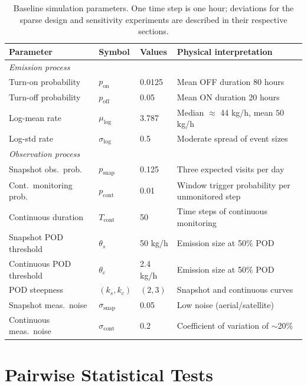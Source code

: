 \documentclass[11pt]{article}
\begin{document}
\begin{table}[h]
\centering
\caption{Baseline simulation parameters. One time step is one hour; deviations for the sparse design and sensitivity experiments are described in their respective sections.}
\label{tab:params}
\begin{tabular}{@{}p{}llp{}@{}}
\toprule
Parameter & Symbol & Values & Physical interpretation \\
\midrule
\multicolumn{4}{l}{\textit{Emission process}} \\
Turn-on probability & $p_{\text{on}}$ & 0.0125 & Mean OFF duration 80 hours \\
Turn-off probability & $p_{\text{off}}$ & 0.05 & Mean ON duration 20 hours \\
Log-mean rate & $\mu_{\log}$ & 3.787 & Median $\approx$ 44 kg/h, mean $50$ kg/h \\
Log-std rate & $\sigma_{\log}$ & 0.5 & Moderate spread of event sizes \\
\midrule
\multicolumn{4}{l}{\textit{Observation process}} \\
Snapshot obs.\ prob. & $p_{\text{snap}}$ & 0.125 & Three expected visits per day \\
Cont.\ monitoring prob. & $p_{\text{cont}}$ & 0.01 & Window trigger probability per unmonitored step \\
Continuous duration & $T_{\text{cont}}$ & 50 & Time steps of continuous monitoring \\
Snapshot POD threshold & $\theta_s$ & 50 kg/h & Emission size at 50\% POD \\
Continuous POD threshold & $\theta_c$ & 2.4 kg/h & Emission size at 50\% POD \\
POD steepness & $(k_s,k_c)$ & $(2,3)$ & Snapshot and continuous curves \\
Snapshot meas.\ noise & $\sigma_{\text{snap}}$ & 0.05 & Low noise (aerial/satellite) \\
Continuous meas.\ noise & $\sigma_{\text{cont}}$ & 0.2 & Coefficient of variation of $\sim$20\% \\

\bottomrule
\end{tabular}
\end{table}



\section{Pairwise Statistical Tests}
\label{sec:pairwise_tests}
\end{document}
